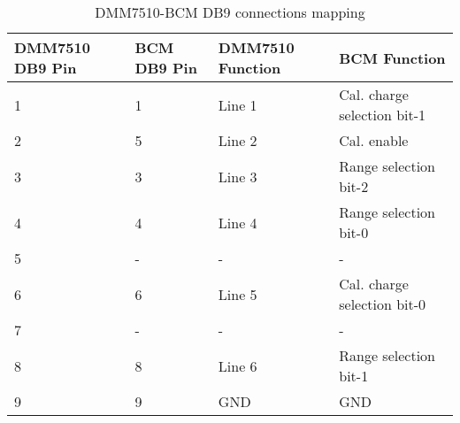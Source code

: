 \documentclass[paper=a4, fontsize=11pt]{scrartcl}
\numberwithin{figure}{section}			%
\numberwithin{table}{section}			%
\begin{document}
\begin{table}
	\center
	\caption{DMM7510-BCM DB9 connections mapping}
	\begin{tabular}{m{2cm} m{2cm} m{4cm} m{6cm}}
		\bfseries DMM7510 DB9 Pin & \bfseries BCM DB9 Pin & \bfseries DMM7510 Function & \bfseries BCM Function \\ \hline
		1 & 1 & Line 1 & Cal. charge selection bit-1 \\ \hline
		2 & 5 & Line 2 & Cal. enable \\ \hline
		3 & 3 & Line 3 & Range selection bit-2 \\ \hline
		4 & 4 & Line 4 & Range selection bit-0 \\ \hline
		5 & - & - & - \\ \hline
		6 & 6 & Line 5 & Cal. charge selection bit-0 \\ \hline
		7 & - & - & - \\ \hline
		8 & 8 & Line 6 & Range selection bit-1 \\ \hline
		9 & 9 & GND & GND \\ \hline
	\end{tabular}
\end{table}

\end{document}

